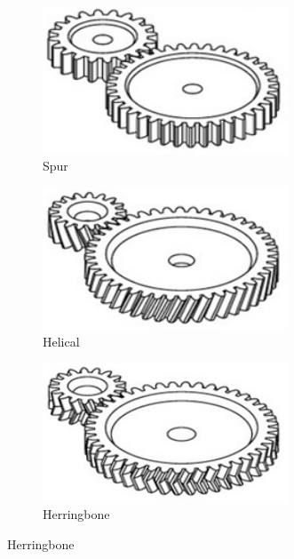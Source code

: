\begin{figure}[H]
	\begin{subfigure}[b]{.32\linewidth}
		\includegraphics[width=0.8\textwidth]{imgs/gear_spur.png}
		\caption{Spur}
	\end{subfigure}\begin{subfigure}[b]{.32\linewidth}
		\includegraphics[width=0.8\textwidth]{imgs/gear_helical.png}
		\caption{Helical}
	\end{subfigure}\begin{subfigure}[b]{.32\linewidth}
		\includegraphics[width=0.8\textwidth]{imgs/gear_herringbore.png}
		\caption{Herringbone}
	\end{subfigure}
	

\end{figure}
